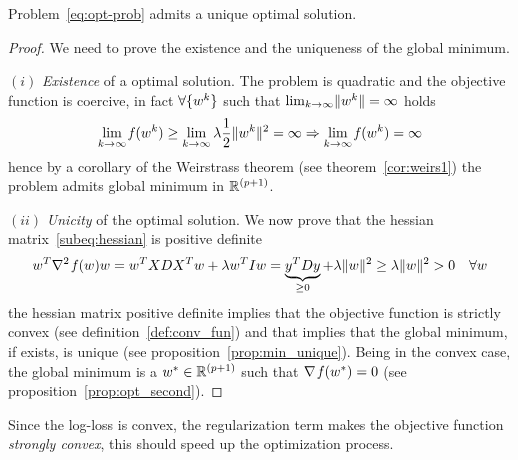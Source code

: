 \begin{prop}
Problem~\eqref{eq:opt-prob} admits a unique optimal solution.
\end{prop}
\begin{proof}
We need to prove the existence and the uniqueness of the global minimum.

\noindent$(i)$ \emph{Existence} of a optimal solution. The problem is quadratic and the objective function is coercive, in fact $\forall\{w^k\}$ such that $\lim_{k\to\infty}\lVert w^k\rVert=\infty$ holds
\[
\lim_{k\to\infty}\operatorname*{\mathit{f}}(w^k)\geq\lim_{k\to\infty}\lambda\frac{1}{2}\lVert w^k\rVert^2=\infty\Rightarrow\lim_{k\to\infty}\operatorname*{\mathit{f}}(w^k)=\infty
\]
hence by a corollary of the Weirstrass theorem (see theorem~\vref{cor:weirs1}) the problem admits global minimum in $\mathbb{R}^{(p+1)}$.

\noindent$(ii)$ \emph{Unicity} of the optimal solution. We now prove that the hessian matrix~\eqref{subeq:hessian} is positive definite
\[
w^T\nabla^2\operatorname*{\mathit{f}}(w)w=w^TXDX^Tw+\lambda w^TIw=\underbrace{y^TDy}_{\geq0}+\lambda\lVert w\rVert^2\geq\lambda\lVert w\rVert^2>0\quad\forall w
\]
the hessian matrix positive definite implies that the objective function is strictly convex (see definition~\ref{def:conv_fun}) and that implies that the global minimum, if exists, is unique (see proposition~\ref{prop:min_unique}). Being in the convex case, the global minimum is a $w^\ast\in\mathbb{R}^{(p+1)}$ such that $\nabla\operatorname*{\mathit{f}}(w^\ast)=0$ (see proposition~\ref{prop:opt_second}).\qedhere
\end{proof}

\begin{rmk}
Since the log-loss is convex, the regularization term makes the objective function \emph{strongly convex}, this should speed up the optimization process.
\end{rmk}


